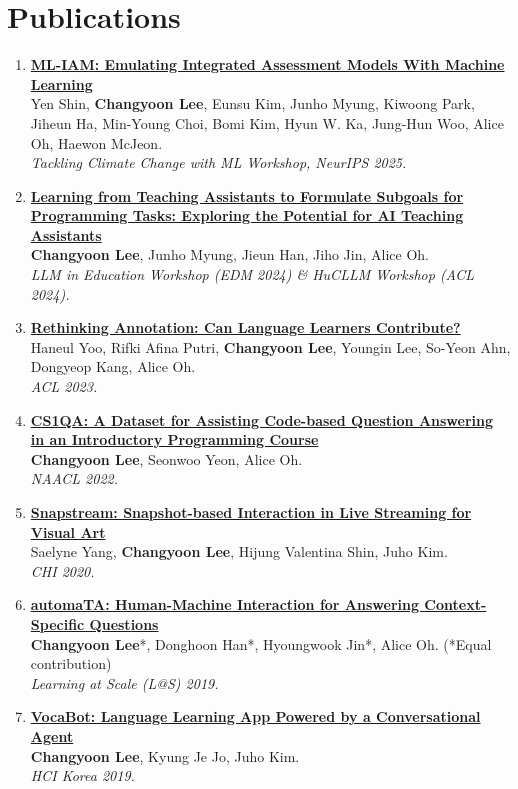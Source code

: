 \documentclass[11pt,a4paper]{article}
\newcommand{\me}{\textbf{Changyoon Lee}}
\begin{document}
\section{Publications}
\begin{enumerate}[leftmargin=1.3em,itemsep=0.5em,label=\arabic*.]
\item \href{https://egusphere.copernicus.org/preprints/2026/egusphere-2025-5305/egusphere-2025-5305.pdf}{\textbf{ML-IAM: Emulating Integrated Assessment Models With Machine Learning}}\\
{\small Yen Shin, \me, Eunsu Kim, Junho Myung, Kiwoong Park, Jiheun Ha, Min-Young Choi, Bomi Kim, Hyun W. Ka, Jung-Hun Woo, Alice Oh, Haewon McJeon.}\\
{\small\color{soft}\itshape Tackling Climate Change with ML Workshop, NeurIPS 2025.}
\item \href{https://ceur-ws.org/Vol-3840/L3MNGET24_paper5.pdf}{\textbf{Learning from Teaching Assistants to Formulate Subgoals for Programming Tasks: Exploring the Potential for AI Teaching Assistants}}\\
{\small \me, Junho Myung, Jieun Han, Jiho Jin, Alice Oh.}\\
{\small\color{soft}\itshape LLM in Education Workshop (EDM 2024) \& HuCLLM Workshop (ACL 2024).}
\item \href{https://aclanthology.org/2023.acl-long.822/}{\textbf{Rethinking Annotation: Can Language Learners Contribute?}}\\
{\small Haneul Yoo, Rifki Afina Putri, \me, Youngin Lee, So-Yeon Ahn, Dongyeop Kang, Alice Oh.}\\
{\small\color{soft}\itshape ACL 2023.}
\item \href{https://aclanthology.org/2022.naacl-main.148/}{\textbf{CS1QA: A Dataset for Assisting Code-based Question Answering in an Introductory Programming Course}}\\
{\small \me, Seonwoo Yeon, Alice Oh.}\\
{\small\color{soft}\itshape NAACL 2022.}
\item \href{https://dl.acm.org/doi/10.1145/3313831.3376390}{\textbf{Snapstream: Snapshot-based Interaction in Live Streaming for Visual Art}}\\
{\small Saelyne Yang, \me, Hijung Valentina Shin, Juho Kim.}\\
{\small\color{soft}\itshape CHI 2020.}
\item \href{https://dl.acm.org/doi/10.1145/3330430.3333658}{\textbf{automaTA: Human-Machine Interaction for Answering Context-Specific Questions}}\\
{\small \me*, Donghoon Han*, Hyoungwook Jin*, Alice Oh. \color{soft}(*Equal contribution)}\\
{\small\color{soft}\itshape Learning at Scale (L@S) 2019.}
\item \href{https://www.dbpia.co.kr/journal/articleDetail?nodeId=NODE08008119}{\textbf{VocaBot: Language Learning App Powered by a Conversational Agent}}\\
{\small \me, Kyung Je Jo, Juho Kim.}\\
{\small\color{soft}\itshape HCI Korea 2019.}
\end{enumerate}
\end{document}
